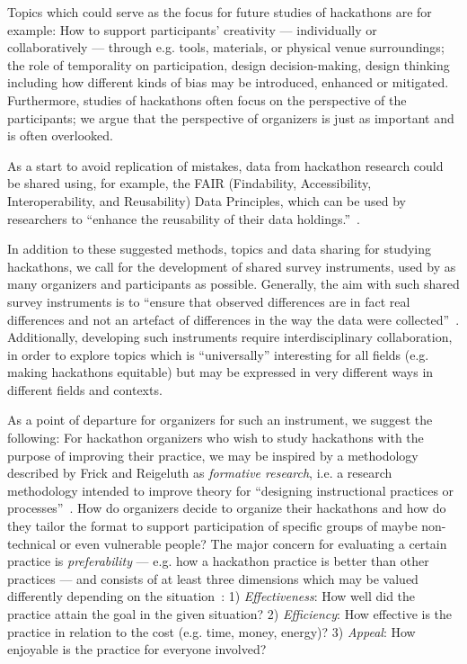 \documentclass{ieeeaccess}
\begin{document}
Topics which could serve as the focus for future studies of hackathons are for example: How to support participants' creativity --- individually or collaboratively --- through e.g. tools, materials, or physical venue surroundings; the role of temporality on participation, design decision-making, design thinking including how different kinds of bias may be introduced, enhanced or mitigated.
Furthermore, studies of hackathons often focus on the perspective of the participants; we argue that the perspective of organizers is just as important and is often overlooked. 

As a start to avoid replication of mistakes, data from hackathon research could be shared using, for example, the FAIR (Findability, Accessibility, Interoperability, and Reusability) Data Principles, which can be used by researchers to ``enhance the reusability of their data holdings.''~\cite{wilkinson2016fair}.

In addition to these suggested methods, topics and data sharing for studying hackathons, we call for the development of shared survey instruments, used by as many organizers and participants as possible.
Generally, the aim with such shared survey instruments is to ``ensure that observed differences are in fact real differences and not an artefact of differences in the way the data were collected''~\cite{collins2003pretesting}.
Additionally, developing such instruments require interdisciplinary collaboration, in order to explore topics which is ``universally'' interesting for all fields (e.g. making hackathons equitable) but may be expressed in very different ways in different fields and contexts. 

As a point of departure for organizers for such an instrument, we suggest the following: 
For hackathon organizers who wish to study hackathons with the purpose of improving their practice, we may be inspired by a methodology described by Frick and Reigeluth as \textit{formative research}, i.e. a research methodology intended to improve theory for ``designing instructional practices or processes''~\cite{frick1999formative}.
How do organizers decide to organize their hackathons and how do they tailor the format to support participation of specific groups of maybe non-technical or even vulnerable people? 
The major concern for evaluating a certain practice is \textit{preferability} --- e.g. how a hackathon practice is better than other practices --- and consists of at least three dimensions which may be valued differently depending on the situation~\cite{frick1999formative}: 
1) \textit{Effectiveness}: How well did the practice attain the goal in the given situation?
2) \textit{Efficiency}: How effective is the practice in relation to the cost (e.g. time, money, energy)? 
3) \textit{Appeal}: How enjoyable is the practice for everyone involved?
\end{document}
